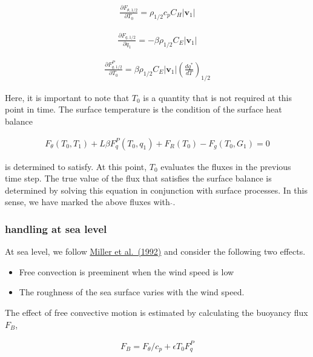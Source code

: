 \begin{eqnarray}
\frac{\partial{F_{\theta,1/2}}}{\partial {T_0}}
= \rho_{1/2} c_p C_H |{\mathbf{v}}_1|
\end{eqnarray}

\begin{eqnarray}
\frac{\partial{F_{q,1/2}}}{\partial {q_1}}
 =  - \beta \rho_{1/2} C_E |{\mathbf{v}}_1|
\end{eqnarray}

\begin{eqnarray}
\frac{\partial{F_{q,1/2}^P}}{\partial {T_0}}
 =  \beta \rho_{1/2} C_E |{\mathbf{v}}_1| \left( \frac{d {q^*}}{d {T}} \right)_{1/2}
\end{eqnarray}

Here, it is important to note that \(T_0\) is a quantity that is not
required at this point in time. The surface temperature is the condition
of the surface heat balance

\begin{eqnarray}
   F_\theta(T_0,T_1) + L \beta F_q^P(T_0,q_1) + F_R(T_0) - F_g(T_0,G_1) = 0
\end{eqnarray}

is determined to satisfy. At this point, \(T_0\) evaluates the fluxes in
the previous time step. The true value of the flux that satisfies the
surface balance is determined by solving this equation in conjunction
with surface processes. In this sense, we have marked the above fluxes
with \(\hat{{}}\).

\hypertarget{handling-at-sea-level}{%
\subsubsection{handling at sea level}\label{handling-at-sea-level}}

At sea level, we follow
\href{papers/Millers1992_Measuring_dynamic_surface\%20and_interfacial_tensions.pdf}{Miller
et al.~(1992)} and consider the following two effects.

\begin{itemize}
\item
  Free convection is preeminent when the wind speed is low
\item
  The roughness of the sea surface varies with the wind speed.
\end{itemize}

The effect of free convective motion is estimated by calculating the
buoyancy flux \(F_B\),

\begin{eqnarray}
  F_B = F_\theta/c_p + \epsilon T_0 F_q^P
\end{eqnarray}

